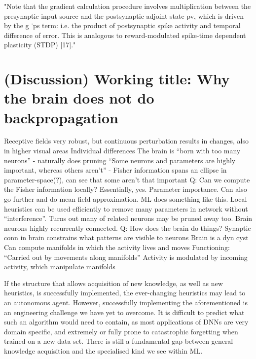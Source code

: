 \documentclass[mphil,deptreport,ianc]{infthesis} %
\begin{document}
"Note that the gradient calculation procedure involves multiplication between the presynaptic input source and the postsynaptic adjoint state pv, which is driven by the g ˙ps term: i.e. the product of postsynaptic spike activity and temporal difference of error. This is analogous to reward-modulated spike-time dependent plasticity (STDP) [17]."



\chapter{(Discussion) Working title: Why the brain does not do backpropagation}

Receptive fields very robust, but continuous perturbation results in changes, also in higher visual areas
Individual differences
The brain is “born with too many neurons” - naturally does pruning
“Some neurons and parameters are highly important, whereas others aren’t” - Fisher information spans an ellipse in parameter-space(?), can see that some aren’t that important
Q: Can we compute the Fisher information locally? Essentially, yes. Parameter importance. Can also go further and do mean field approximation. ML does something like this. Local heuristics can be used efficiently to remove many parameters in network without “interference”. Turns out many of related neurons may be pruned away too.
Brain neurons highly recurrently connected.
Q: How does the brain do things?
Synaptic conn in brain constrains what patterns are visible to neurons
Brain is a dyn cyst
Can compute manifolds in which the activity lives and moves
Functioning: “Carried out by movements along manifolds”
Activity is modulated by incoming activity, which manipulate manifolds


If the structure that allows acquisition of new knowledge, as well as new heuristics, is successfully implemented, the ever-changing heuristics may lead to an autonomous agent. 
However, successfully implementing the aforementioned is an engineering challenge we have yet to overcome. It is difficult to predict what such an algorithm would need to contain, as most applications of DNNs are very domain specific, and extremely or fully prone to catastrophic forgetting when trained on a new data set.
There is still a fundamental gap between general knowledge acquisition and the specialised kind we see within ML.
\end{document}
